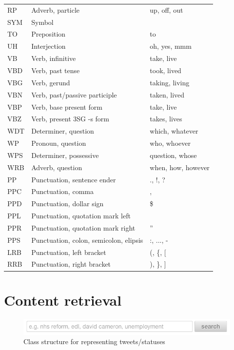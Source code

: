 \begin{center}
\begin{longtable}{ | l | l | l |}
  RP & Adverb, particle & up, off, out \\
  SYM & Symbol &  \\
  TO & Preposition & to \\
  UH & Interjection & oh, yes, mmm \\
  VB & Verb, infinitive & take, live \\
  VBD & Verb, past tense & took, lived \\
  VBG & Verb, gerund & taking, living \\
  VBN & Verb, past/passive participle & taken, lived \\
  VBP & Verb, base present form & take, live \\
  VBZ & Verb, present 3SG -s form & takes, lives \\
  WDT & Determiner, question & which, whatever \\
  WP & Pronoun, question & who, whoever \\
  WPS & Determiner, possessive & question, whose \\
  WRB & Adverb, question & when, how, however \\
  PP & Punctuation, sentence ender & ., !, ? \\
  PPC & Punctuation, comma  & , \\
  PPD & Punctuation, dollar sign & \$ \\
  PPL & Punctuation, quotation mark left & \\
  PPR & Punctuation, quotation mark right & '' \\
  PPS & Punctuation, colon, semicolon, elipsis & :, ..., - \\
  LRB & Punctuation, left bracket & (, \{, [ \\
  RRB & Punctuation, right bracket & ), \}, ] \\
	\hline
\end{longtable}
\end{center}

\section{Content retrieval}

\begin{figure}[h!]
	\caption{Class structure for representing tweets/statuses}
	\label{fig:status_uml}
	\centering
	\includegraphics[width=1\textwidth]{figures/labeller_search_screenshot.png}
\end{figure}


